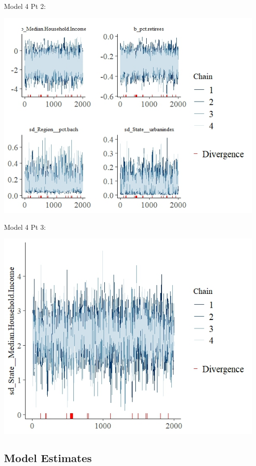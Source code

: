 \documentclass[12pt]{article}
\begin{document}
Model 4 Pt 2: 

\includegraphics[scale = 1.3]{trace_plots/trace_model4_part2.jpeg}

Model 4 Pt 3: 

\includegraphics[scale = 1.4]{trace_plots/trace_model4_part3.jpeg}





\clearpage
\FloatBarrier
\subsection*{Model Estimates}
\end{document}
